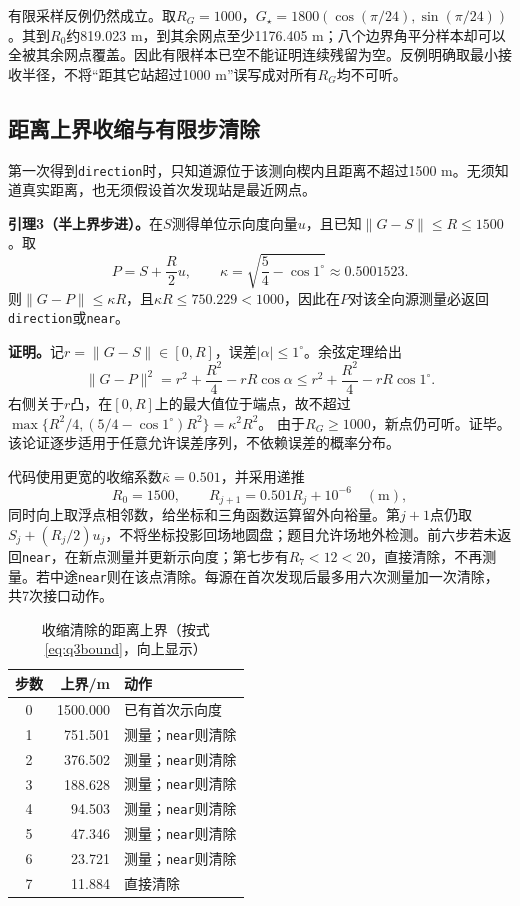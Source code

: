 有限采样反例仍然成立。取$R_G=1000$，$G_\star=1800(\cos(\pi/24),\sin(\pi/24))$。其到$R_0$约819.023 m，到其余网点至少1176.405 m；八个边界角平分样本却可以全被其余网点覆盖。因此有限样本已空不能证明连续残留为空。反例明确取最小接收半径，不将“距其它站超过1000 m”误写成对所有$R_G$均不可听。

\subsection{距离上界收缩与有限步清除}

第一次得到\texttt{direction}时，只知道源位于该测向楔内且距离不超过1500 m。无须知道真实距离，也无须假设首次发现站是最近网点。

\textbf{引理3（半上界步进）。}在$S$测得单位示向度向量$u$，且已知$\|G-S\|\le R\le1500$。取
\begin{equation}
P=S+\frac R2u,\qquad \kappa=\sqrt{\frac54-\cos1^\circ}\approx0.5001523.
\label{eq:q3contract}
\end{equation}
则$\|G-P\|\le\kappa R$，且$\kappa R\le750.229<1000$，因此在$P$对该全向源测量必返回\texttt{direction}或\texttt{near}。

\textbf{证明。}记$r=\|G-S\|\in[0,R]$，误差$|\alpha|\le1^\circ$。余弦定理给出
\[
\|G-P\|^2=r^2+\frac{R^2}{4}-rR\cos\alpha
\le r^2+\frac{R^2}{4}-rR\cos1^\circ.
\]
右侧关于$r$凸，在$[0,R]$上的最大值位于端点，故不超过
$\max\{R^2/4,(5/4-\cos1^\circ)R^2\}=\kappa^2R^2$。
由于$R_G\ge1000$，新点仍可听。证毕。该论证逐步适用于任意允许误差序列，不依赖误差的概率分布。

代码使用更宽的收缩系数$\bar\kappa=0.501$，并采用递推
\begin{equation}
R_0=1500,\qquad R_{j+1}=0.501R_j+10^{-6}\quad (\mathrm m),
\label{eq:q3bound}
\end{equation}
同时向上取浮点相邻数，给坐标和三角函数运算留外向裕量。第$j+1$点仍取$S_j+(R_j/2)u_j$，不将坐标投影回场地圆盘；题目允许场地外检测。前六步若未返回\texttt{near}，在新点测量并更新示向度；第七步有$R_7<12<20$，直接清除，不再测量。若中途\texttt{near}则在该点清除。每源在首次发现后最多用六次测量加一次清除，共7次接口动作。

\begin{table}[htbp]
\centering
\caption{收缩清除的距离上界（按式\eqref{eq:q3bound}，向上显示）}
\label{tab:q3contraction}
\begin{tabular}{crl}\toprule
步数 & 上界/m & 动作\\\midrule
0 & 1500.000 & 已有首次示向度\\
1 & 751.501 & 测量；\texttt{near}则清除\\
2 & 376.502 & 测量；\texttt{near}则清除\\
3 & 188.628 & 测量；\texttt{near}则清除\\
4 & 94.503 & 测量；\texttt{near}则清除\\
5 & 47.346 & 测量；\texttt{near}则清除\\
6 & 23.721 & 测量；\texttt{near}则清除\\
7 & 11.884 & 直接清除\\\bottomrule
\end{tabular}
\end{table}

